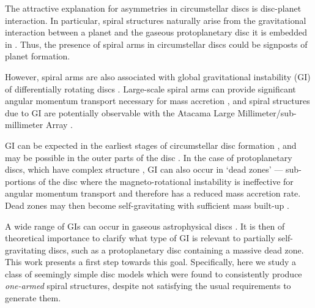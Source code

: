 \documentclass[useAMS,usenatbib]{mn2e}
\begin{document}
The attractive explanation for asymmetries in circumstellar discs is
disc-planet interaction. In particular, spiral structures  
naturally arise from the gravitational interaction between a
planet and the gaseous protoplanetary disc it is embedded in
\citep[see, e.g.][for a recent review]{baruteau13b}. Thus, the
presence of spiral arms in circumstellar discs could be signposts of 
planet formation.  

However, spiral arms are also associated with global gravitational 
instability (GI) of differentially rotating discs
\citep{goldreich65,laughlin96b,laughlin98,nelson98,lodato05,forgan11}. Large-scale
spiral arms can provide significant angular momentum transport
necessary for mass accretion \citep{lynden-bell72, papaloizou91,balbus99,lodato04}, and
spiral structures due to GI are potentially observable with the Atacama Large 
Millimeter/sub-millimeter Array \citep{cossins10,dipierror14}.   

GI can be expected in the earliest stages of 
circumstellar disc formation
\citep{kratter10b,inutsuka10,tsukamoto13}, and may be possible in the
outer parts of the disc \citep{rafikov05,matzner05,kimura12}.  
In the case of protoplanetary discs, which have complex structure
\citep{armitage10}, GI can also occur in `dead
zones' --- sub-portions of the disc where the magneto-rotational
instability is ineffective for angular momentum transport
\citep{gammie96,turner08,landry13} and therefore has a reduced mass
accretion rate. Dead zones may then become
self-gravitating with sufficient mass built-up
\citep{armitage01,martin12,martin12b,zhu09,zhu10,zhu10b,bae13,bae14}.   

A wide range of GIs can occur in  gaseous 
astrophysical discs 
\citep{papaloizou89,christo92,christo93,hadley11,hadley14}. It is then
of theoretical importance to clarify what type of GI is relevant to 
partially self-gravitating discs, such as a protoplanetary disc containing a 
massive dead zone.  %
This work presents a first step towards this goal. Specifically, here we 
study a class of seemingly simple disc models which were found to 
consistently produce \emph{one-armed} spiral structures, despite not 
satisfying the usual requirements to generate them. 

\end{document}
